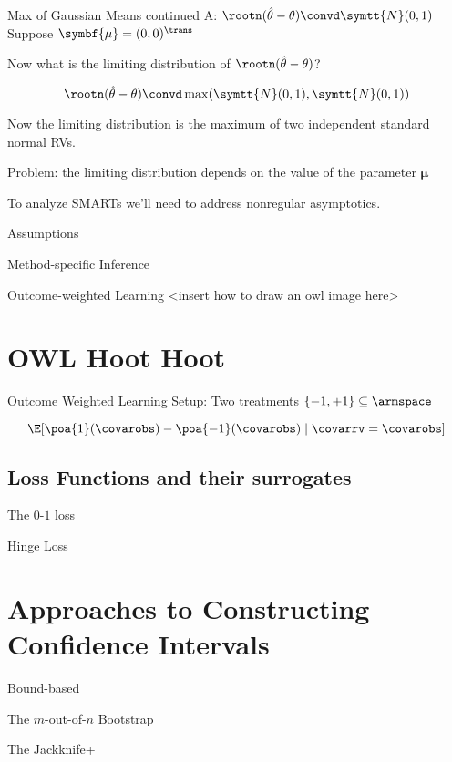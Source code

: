 \documentclass[aspectratio=169, professionalfonts]{beamer}
\begin{document}
\begin{frame}{Max of Gaussian Means continued}
	A: $\rootn (\hat{\theta} - \theta) \convd \symtt{N}(0, 1)$
	\pause
	\vfill
	Suppose $\symbf{\mu} = (0 , 0)^{\trans}$

	Now what is the limiting distribution of $ \rootn (\hat{\theta} - \theta)$?

	\vfill \pause

	$$\rootn (\hat{\theta} - \theta) \convd \max(\symtt{N}(0, 1), \symtt{N}(0, 1))$$

	Now the limiting distribution is the maximum of two independent standard
	normal RVs.

	\vfill \pause

	Problem: the limiting distribution depends on the value of the parameter
	$\symbf{\mu}$

	\vfill

	To analyze SMARTs we'll need to address nonregular asymptotics.
\end{frame}


\begin{frame}{Assumptions}
\end{frame}

\begin{frame}{Method-specific Inference}
\end{frame}

\begin{frame}{Outcome-weighted Learning}
	<insert how to draw an owl image here>
\end{frame}


\section{OWL Hoot Hoot}

\begin{frame}{Outcome Weighted Learning}
	Setup: Two treatments $\{-1, +1\} \subseteq \armspace$

	$$\E[\poa{1}(\covarobs) - \poa{-1}(\covarobs) \mid \covarrv = \covarobs]$$

\end{frame}

\begin{frame}{}
\end{frame}


\subsection{Loss Functions and their surrogates}
\begin{frame}{The $0$-$1$ loss}
\end{frame}

\begin{frame}{Hinge Loss}
\end{frame}

\section{Approaches to Constructing Confidence Intervals}

\begin{frame}{Bound-based}
\end{frame}

\begin{frame}{The $m$-out-of-$n$ Bootstrap}
\end{frame}

\begin{frame}{The Jackknife+}
\end{frame}
\end{document}
